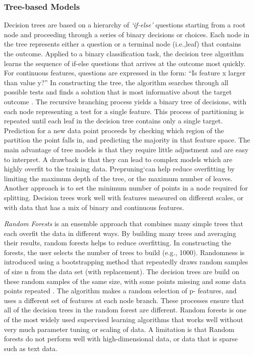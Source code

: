 \documentclass[sigconf]{acmart}
\begin{document}
\subsubsection{Tree-based Models} Decision trees are based on a hierarchy of 
\emph{`if-else'} questions starting from a root node and proceeding through a 
series of binary decisions or choices. Each node in the tree represents either 
a question or a terminal node (i.e.,leaf) that contains the outcome. Applied to 
a binary classification task, the decision tree algorithm learns the sequence
of if-else questions that arrives at the outcome most quickly. For continuous 
features, questions are expressed in the form: ``Is feature x larger than 
value y?'' In constructing the tree, the algorithm searches through all 
possible tests and finds a solution that is most informative about the target 
outcome \cite{muller17}. The recursive branching process yields a binary tree 
of decisions, with each node representing a test for a single feature. This 
process of partitioning is repeated until each leaf in the decision tree 
contains only a single target. Prediction for a new data point proceeds by 
checking which region of the partition the point falls in, and predicting the 
majority in that feature space. The main advantage of tree models is that they 
require little adjustment and are easy to interpret. A drawback is that they 
can lead to complex models which are highly overfit to the training data. 
Prepruning`can help reduce overfitting by limiting the maximum depth of the 
tree, or the maximum number of leaves. Another approach is to set the minimum 
number of points in a node required for splitting. Decision trees work well 
with features measured on different scales, or with data that has a mix of 
binary and continuous features. 


\emph{Random Forests} is an ensemble approach that combines many simple trees 
that each overfit the data in different ways. By building many trees and 
averaging their results, random forests helps to reduce overfitting. In 
constructing the forests, the user selects the number of trees to build 
(e.g., 1000). Randomness is introduced using a bootstrapping method that 
repeatedly draws random samples of size n from the data set (with replacement).  
The decision trees are build on these random samples of the same size, with 
some points missing and some data points repeated \cite{muller17,raschka17}.
The algorithm makes a random selection of p- features, and uses a different 
set of features at each node branch. These processes ensure that all of the 
decision trees in the random forest are different. Random forests is one of 
the most widely used supervised learning algorithms that works well without 
very much parameter tuning or scaling of data. A limitation is that Random 
forests do not perform well with high-dimensional data, or data that is 
sparse such as text data.
\end{document}
